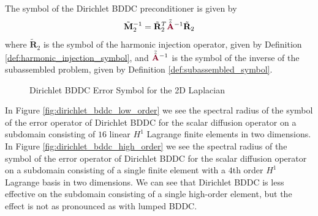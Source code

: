 \begin{definition}
The symbol of the Dirichlet BDDC preconditioner is given by
\begin{equation}
\tilde{\mathbf{M}}^{-1}_2 = \tilde{\mathbf{R}}^T_2 \tilde{\hat{{\color{burgundy}\mathbf{A}}}}^{-1} \tilde{\mathbf{R}}_2
\end{equation}
where $\tilde{\mathbf{R}}_2$ is the symbol of the harmonic injection operator, given by Definition \ref{def:harmonic_injection_symbol}, and $\tilde{\hat{{\color{burgundy}\mathbf{A}}}}^{-1}$ is the symbol of the inverse of the subassembled problem, given by Definition \ref{def:subassembled_symbol}. 
\label{def:dirichlet_bddc_symbol}
\end{definition}

\begin{figure}[!ht]
  \centering
  \hfill
  \caption{Dirichlet BDDC Error Symbol for the 2D Laplacian}
\end{figure}

In Figure \ref{fig:dirichlet_bddc_low_order} we see the spectral radius of the symbol of the error operator of Dirichlet BDDC for the scalar diffusion operator on a subdomain consisting of $16$ linear $H^1$ Lagrange finite elements in two dimensions.
In Figure \ref{fig:dirichlet_bddc_high_order} we see the spectral radius of the symbol of the error operator of Dirichlet BDDC for the scalar diffusion operator on a subdomain consisting of a single finite element with a $4$th order $H^1$ Lagrange basis in two dimensions.
We can see that Dirichlet BDDC is less effective on the subdomain consisting of a single high-order element, but the effect is not as pronounced as with lumped BDDC.